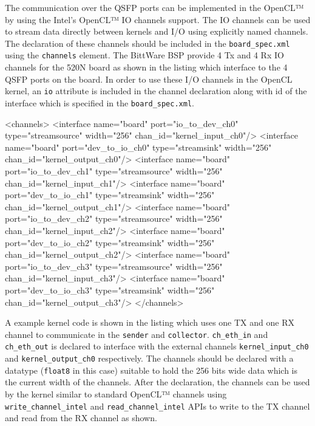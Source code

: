 The communication over the QSFP ports can be implemented in the OpenCL™ by using the
Intel's OpenCL™ IO channels support. The IO channels can be used to stream data
directly between kernels and I/O using explicitly named channels. The declaration
of these channels should be included in the \texttt{board\_spec.xml} using the
\texttt{channels} element. The BittWare BSP provide 4 Tx and 4 Rx IO channels for the 520N board
as shown in the listing {} which interface to the 4 QSFP ports on the board.
In order to use these I/O channels in the OpenCL kernel,
an \texttt{io} attribute is included in the channel declaration along with id of
the interface which is specified in the \texttt{board\_spec.xml}.

\begin{XmlCode}
<channels>
    <interface name="board" port="io_to_dev_ch0" type="streamsource" width="256" chan_id="kernel_input_ch0"/>
    <interface name="board" port="dev_to_io_ch0" type="streamsink" width="256" chan_id="kernel_output_ch0"/>
    <interface name="board" port="io_to_dev_ch1" type="streamsource" width="256" chan_id="kernel_input_ch1"/>
    <interface name="board" port="dev_to_io_ch1" type="streamsink" width="256" chan_id="kernel_output_ch1"/>
    <interface name="board" port="io_to_dev_ch2" type="streamsource" width="256" chan_id="kernel_input_ch2"/>
    <interface name="board" port="dev_to_io_ch2" type="streamsink" width="256" chan_id="kernel_output_ch2"/>
    <interface name="board" port="io_to_dev_ch3" type="streamsource" width="256" chan_id="kernel_input_ch3"/>
    <interface name="board" port="dev_to_io_ch3" type="streamsink" width="256" chan_id="kernel_output_ch3"/>
</channels>
\end{XmlCode}
A example kernel code is shown in the listing {} which uses one TX and one RX channel to
communicate in the \texttt{sender} and \texttt{collector}.
\texttt{ch\_eth\_in} and \texttt{ch\_eth\_out} is declared to interface with
the external channels \texttt{kernel\_input\_ch0} and \texttt{kernel\_output\_ch0} respectively.
The channels should be declared with a datatype (\texttt{float8} in this case)
suitable to hold the 256 bits wide data which is the current width of the channels.
After the declaration, the channels can be used by the kernel similar to standard OpenCL™
channels using \texttt{write\_channel\_intel} and \texttt{read\_channel\_intel} APIs to write
to the TX channel and read from the RX channel as shown.

